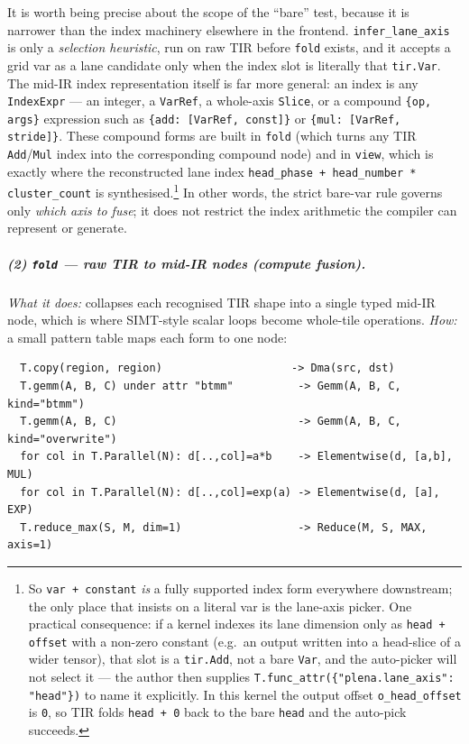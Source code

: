 \documentclass[
  10pt,
]{article}
\begin{document}
It is worth being precise about the scope of the ``bare'' test, because
it is narrower than the index machinery elsewhere in the frontend.
\texttt{infer\_lane\_axis} is only a \emph{selection heuristic}, run on
raw TIR before \texttt{fold} exists, and it accepts a grid var as a lane
candidate only when the index slot is literally that \texttt{tir.Var}.
The mid-IR index representation itself is far more general: an index is
any \texttt{IndexExpr} --- an integer, a \texttt{VarRef}, a whole-axis
\texttt{Slice}, or a compound \texttt{\{op, args\}} expression such as
\texttt{\{add: [VarRef, const]\}} or \texttt{\{mul: [VarRef, stride]\}}.
These compound forms are built in \texttt{fold} (which turns any TIR
\texttt{Add}/\texttt{Mul} index into the corresponding compound node) and
in \texttt{view}, which is exactly where the reconstructed lane index
\texttt{head\_phase + head\_number * cluster\_count} is synthesised.\footnote{So
\texttt{var + constant} \emph{is} a fully supported index form
everywhere downstream; the only place that insists on a literal var is
the lane-axis picker. One practical consequence: if a kernel indexes its
lane dimension only as \texttt{head + offset} with a non-zero constant
(e.g.\ an output written into a head-slice of a wider tensor), that slot
is a \texttt{tir.Add}, not a bare \texttt{Var}, and the auto-picker will
not select it --- the author then supplies
\texttt{T.func\_attr(\{"plena.lane\_axis": "head"\})} to name it
explicitly. In this kernel the output offset \texttt{o\_head\_offset} is
\texttt{0}, so TIR folds \texttt{head + 0} back to the bare
\texttt{head} and the auto-pick succeeds.} In other words, the strict
bare-var rule governs only \emph{which axis to fuse}; it does not
restrict the index arithmetic the compiler can represent or generate.

\subparagraph{(2) \texttt{fold} --- raw TIR to mid-IR nodes (compute
fusion).}\label{fa-fold} \emph{What it does:} collapses each recognised
TIR shape into a single typed mid-IR node, which is where SIMT-style
scalar loops become whole-tile operations. \emph{How:} a small pattern
table maps each form to one node:

\begin{verbatim}
  T.copy(region, region)                    -> Dma(src, dst)
  T.gemm(A, B, C) under attr "btmm"          -> Gemm(A, B, C, kind="btmm")
  T.gemm(A, B, C)                            -> Gemm(A, B, C, kind="overwrite")
  for col in T.Parallel(N): d[..,col]=a*b    -> Elementwise(d, [a,b], MUL)
  for col in T.Parallel(N): d[..,col]=exp(a) -> Elementwise(d, [a], EXP)
  T.reduce_max(S, M, dim=1)                  -> Reduce(M, S, MAX, axis=1)
\end{verbatim}
\end{document}

